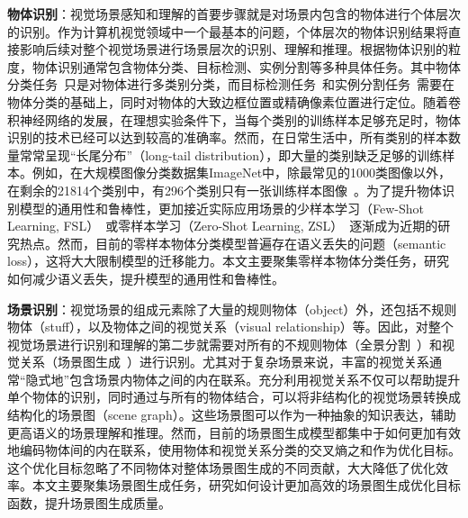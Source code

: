 \begin{asparaenum}
\item \textbf{物体识别}：视觉场景感知和理解的首要步骤就是对场景内包含的物体进行个体层次的识别。作为计算机视觉领域中一个最基本的问题，个体层次的物体识别结果将直接影响后续对整个视觉场景进行场景层次的识别、理解和推理。根据物体识别的粒度，物体识别通常包含物体分类、目标检测、实例分割等多种具体任务。其中物体分类任务~\cite{russakovsky2015imagenet,krizhevsky2012imagenet,simonyan2015very,szegedy2015going,he2016deep,xie2017aggregated,hu2018squeeze}只是对物体进行多类别分类，而目标检测任务~\cite{ren2015faster,liu2016ssd,redmon2016you}和实例分割任务~\cite{he2017mask}需要在物体分类的基础上，同时对物体的大致边框位置或精确像素位置进行定位。随着卷积神经网络的发展，在理想实验条件下，当每个类别的训练样本足够充足时，物体识别的技术已经可以达到较高的准确率。然而，在日常生活中，所有类别的样本数量常常呈现“长尾分布”（long-tail distribution），即大量的类别缺乏足够的训练样本。例如，在大规模图像分类数据集ImageNet中，除最常见的1000类图像以外，在剩余的21814个类别中，有296个类别只有一张训练样本图像~\cite{russakovsky2015imagenet}。为了提升物体识别模型的通用性和鲁棒性，更加接近实际应用场景的少样本学习（Few-Shot Learning, FSL）~\cite{fei2006one}或零样本学习（Zero-Shot Learning, ZSL）~\cite{lampert2009learning}逐渐成为近期的研究热点。然而，目前的零样本物体分类模型普遍存在语义丢失的问题（semantic loss），这将大大限制模型的迁移能力。本文主要聚集零样本物体分类任务，研究如何减少语义丢失，提升模型的通用性和鲁棒性。

\item \textbf{场景识别}：视觉场景的组成元素除了大量的规则物体（object）外，还包括不规则物体（stuff），以及物体之间的视觉关系（visual relationship）等。因此，对整个视觉场景进行识别和理解的第二步就需要对所有的不规则物体（全景分割~\cite{kirillov2019panoptic}）和视觉关系（场景图生成~\cite{johnson2015image}）进行识别。尤其对于复杂场景来说，丰富的视觉关系通常“隐式地”包含场景内物体之间的内在联系。充分利用视觉关系不仅可以帮助提升单个物体的识别，同时通过与所有的物体结合，可以将非结构化的视觉场景转换成结构化的场景图（scene graph）。这些场景图可以作为一种抽象的知识表达，辅助更高语义的场景理解和推理。然而，目前的场景图生成模型都集中于如何更加有效地编码物体间的内在联系，使用物体和视觉关系分类的交叉熵之和作为优化目标。这个优化目标忽略了不同物体对整体场景图生成的不同贡献，大大降低了优化效率。本文主要聚集场景图生成任务，研究如何设计更加高效的场景图生成优化目标函数，提升场景图生成质量。


\end{asparaenum}
